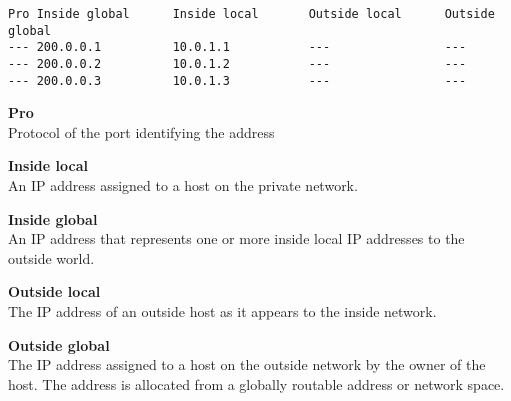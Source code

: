 \begin{lstlisting}
Pro Inside global      Inside local       Outside local      Outside global
--- 200.0.0.1          10.0.1.1           ---                ---
--- 200.0.0.2          10.0.1.2           ---                ---
--- 200.0.0.3          10.0.1.3           ---                ---
\end{lstlisting}


\textbf{Pro} \\
Protocol of the port identifying the address

\textbf{Inside local} \\
An IP address assigned to a host on the private network. 

\textbf{Inside global} \\
An IP address that represents one or more inside local IP addresses to the outside world.

\textbf{Outside local} \\
The IP address of an outside host as it appears to the inside network. 

\textbf{Outside global} \\
The IP address assigned to a host on the outside network by the owner of the host. The address is allocated from a globally routable address or network space.


